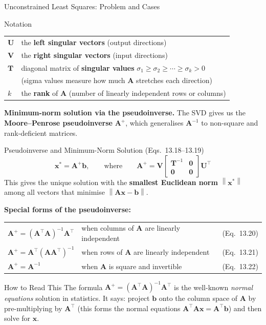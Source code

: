 \documentclass[aspectratio=169,10pt]{beamer}
\newcommand{\bx}{\mathbf{x}}
\newcommand{\bb}{\mathbf{b}}
\newcommand{\bA}{\mathbf{A}}
\newcommand{\bU}{\mathbf{U}}
\newcommand{\bV}{\mathbf{V}}
\newcommand{\bT}{\mathbf{T}}
\newcommand{\norm}[1]{\left\|#1\right\|}
\begin{document}
\begin{frame}[allowframebreaks]{Unconstrained Least Squares: Problem and Cases}
  \begin{block}{Notation}
    \begin{tabular}{ll}
      $\bU$ & the \textbf{left singular vectors} (output directions)\\
      $\bV$ & the \textbf{right singular vectors} (input directions)\\
      $\bT$ & diagonal matrix of \textbf{singular values} $\sigma_1 \geq \sigma_2 \geq \cdots \geq \sigma_k > 0$\\
              & (sigma values measure how much $\bA$ stretches each direction)\\
      $k$   & the \textbf{rank} of $\bA$ (number of linearly independent rows or columns)\\
    \end{tabular}
  \end{block}

  \framebreak

  \textbf{Minimum-norm solution via the pseudoinverse.}  The SVD gives us the
  \textbf{Moore--Penrose pseudoinverse} $\bA^+$, which generalises $\bA^{-1}$ to
  non-square and rank-deficient matrices.

  \begin{block}{Pseudoinverse and Minimum-Norm Solution (Eqs.~13.18--13.19)}
    \[
      \bx^* = \bA^+\bb,
      \qquad\text{where}\qquad
      \bA^+ = \bV\begin{bmatrix}\bT^{-1}&\mathbf{0}\\\mathbf{0}&\mathbf{0}\end{bmatrix}\bU^{\top}
    \]
    This gives the unique solution with the \textbf{smallest Euclidean norm}
    $\norm{\bx^*}$ among all vectors that minimise $\norm{\bA\bx - \bb}$.
  \end{block}

  \textbf{Special forms of the pseudoinverse:}

  \begin{tabular}{lll}
    $\bA^+ = (\bA^{\top}\bA)^{-1}\bA^{\top}$ & when columns of $\bA$ are linearly independent & (Eq.~13.20)\\
    $\bA^+ = \bA^{\top}(\bA\bA^{\top})^{-1}$ & when rows of $\bA$ are linearly independent & (Eq.~13.21)\\
    $\bA^+ = \bA^{-1}$ & when $\bA$ is square and invertible & (Eq.~13.22)\\
  \end{tabular}

  \begin{alertblock}{How to Read This}
    The formula $\bA^+ = (\bA^{\top}\bA)^{-1}\bA^{\top}$ is the well-known
    \emph{normal equations} solution in statistics.  It says: project $\bb$ onto the
    column space of $\bA$ by pre-multiplying by $\bA^{\top}$ (this forms the normal
    equations $\bA^{\top}\bA\bx = \bA^{\top}\bb$) and then solve for $\bx$.
  \end{alertblock}

\end{frame}
\end{document}
